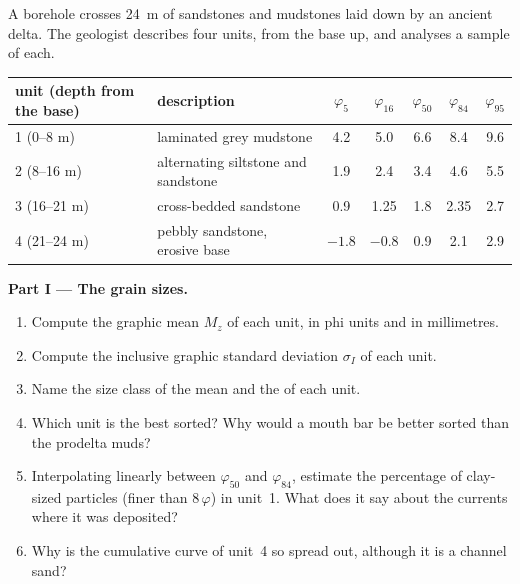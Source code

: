 \begin{problem}
\label{pb:b1:clastic-sediments:1}
A borehole crosses \qty{24}{m} of sandstones and mudstones laid down by an
ancient delta. The geologist describes four units, from the base up, and
analyses a sample of each.

\smallskip
\begin{center}\small
\begin{tabular}{@{}llccccc@{}}
\hline
unit (depth from the base) & description & $\varphi_5$ & $\varphi_{16}$ & $\varphi_{50}$ & $\varphi_{84}$ & $\varphi_{95}$ \\
\hline
1 (0--8 m) & laminated grey mudstone & 4.2 & 5.0 & 6.6 & 8.4 & 9.6 \\
2 (8--16 m) & alternating siltstone and sandstone & 1.9 & 2.4 & 3.4 & 4.6 & 5.5 \\
3 (16--21 m) & cross-bedded sandstone & 0.9 & 1.25 & 1.8 & 2.35 & 2.7 \\
4 (21--24 m) & pebbly sandstone, erosive base & $-1.8$ & $-0.8$ & 0.9 & 2.1 & 2.9 \\
\hline
\end{tabular}
\end{center}

\medskip
\noindent\textbf{Part I --- The grain sizes.}
\begin{enumerate}
  \item Compute the graphic mean $M_z$ of each unit, in phi units and in
        millimetres.
  \item Compute the inclusive graphic standard deviation $\sigma_I$ of each
        unit.
  \item Name the size class of the mean and the  of each unit.
  \item Which unit is the best sorted? Why would a mouth bar be better sorted
        than the prodelta muds?
  \item Interpolating linearly between $\varphi_{50}$ and $\varphi_{84}$,
        estimate the percentage of clay-sized particles (finer than
        $8\,\varphi$) in unit~1. What does it say about the currents where it
        was deposited?
  \item Why is the cumulative curve of unit~4 so spread out, although it is a
        channel sand?
\end{enumerate}


\end{problem}
